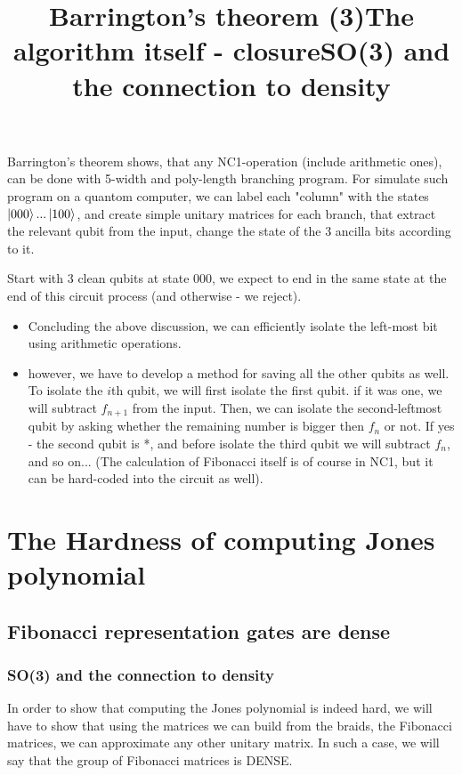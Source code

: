 \documentclass{article}
\begin{document}
\title{Barrington's theorem (3)}
Barrington's theorem shows, that any NC1-operation (include arithmetic ones), can be done with 5-width and poly-length branching program. For simulate such program on a quantom computer, we can label each "column" with the states $\left\vert{000}\right\rangle...\left\vert{100}\right\rangle$, and create simple unitary matrices for each branch, that extract the relevant qubit from the input, change the state of the 3 ancilla bits according to it. 

Start with 3 clean qubits at state 000, we expect to end in the same state at the end of this circuit process (and otherwise - we reject).


\title{The algorithm itself - closure}
\begin{itemize}
\item Concluding the above discussion, we can efficiently isolate the left-most bit using arithmetic operations.
\item however, we have to develop a method for saving all the other qubits as well. To isolate the $i$th qubit, we will first isolate the first qubit. if it was one, we will subtract $f_{n+1}$ from the input. Then, we can isolate the second-leftmost qubit by asking whether the remaining number is bigger then $f_{n}$ or not. If yes - the second qubit is *, and before isolate the third qubit we will subtract $f_{n}$, and so on... (The calculation of Fibonacci itself is of course in NC1, but it can be hard-coded into the circuit as well).
\end{itemize}






\section{The Hardness of computing Jones polynomial}
\subsection{Fibonacci representation gates are dense}
\subsubsection{SO(3) and the connection to density}
\title{SO(3) and the connection to density}
In order to show that computing the Jones polynomial is indeed hard, we will have to show that using the matrices we can build from the braids, the Fibonacci matrices, we can approximate any other unitary matrix. In such a case, we will say that the group of Fibonacci matrices is DENSE.
\end{document}
